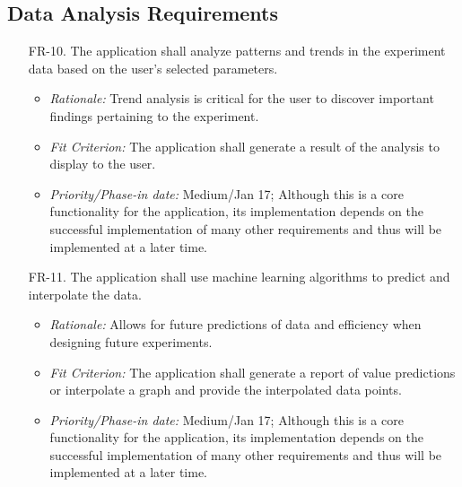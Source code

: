 \documentclass[12pt]{article}
\begin{document}
\subsection{Data Analysis Requirements}
\begin{enumerate}
    \item[FR-10.] The application shall analyze patterns and trends in the experiment data based on the user’s selected parameters.
    \begin{itemize}
      \item \textit{Rationale:} Trend analysis is critical for the user to discover important findings pertaining to the experiment.
      \item \textit{Fit Criterion:} The application shall generate a result of the analysis to display to the user.
      \item \textit{Priority/Phase-in date:} Medium/Jan 17; Although this is a core functionality for the application, its implementation depends on the successful implementation of many other requirements and thus will be implemented at a later time.
    \end{itemize}
    \item[FR-11.] The application shall use machine learning algorithms to predict and interpolate the data.
    \begin{itemize}
      \item \textit{Rationale:} Allows for future predictions of data and efficiency when designing future experiments.
      \item \textit{Fit Criterion:} The application shall generate a report of value predictions or interpolate a graph and provide the interpolated data points.
      \item \textit{Priority/Phase-in date:} Medium/Jan 17; Although this is a core functionality for the application, its implementation depends on the successful implementation of many other requirements and thus will be implemented at a later time.
    \end{itemize}
\end{enumerate}
\end{document}
